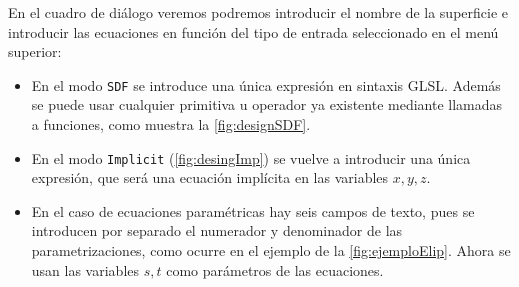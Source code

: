 En el cuadro de diálogo veremos podremos introducir el nombre de la superficie e introducir las ecuaciones en función del tipo de entrada seleccionado en el menú superior:
\begin{itemize}
    \item En el modo \texttt{SDF} se introduce una única expresión en sintaxis GLSL. Además se puede usar cualquier primitiva u operador ya existente mediante llamadas a funciones, como muestra la \autoref{fig:designSDF}.
    \item En el modo \texttt{Implicit} (\autoref{fig:desingImp}) se vuelve a introducir una única expresión, que será una ecuación implícita en las variables $x,y,z$.
    \item En el caso de ecuaciones paramétricas hay seis campos de texto, pues se introducen por separado el numerador y denominador de las parametrizaciones, como ocurre en el ejemplo de la \autoref{fig:ejemploElip}. Ahora se usan las variables $s,t$ como parámetros de las ecuaciones.
\end{itemize}


\newline



